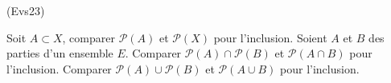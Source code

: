 \begin{tiny}(Evs23)\end{tiny} Soit $A\subset X$, comparer $\mathcal{P}(A)$ et $\mathcal{P}(X)$ pour l'inclusion. Soient $A$ et $B$ des parties d'un ensemble $E$. Comparer $\mathcal{P}(A) \cap \mathcal{P}(B)$ et $\mathcal{P}(A\cap B)$ pour l'inclusion.  Comparer $\mathcal{P}(A) \cup \mathcal{P}(B)$ et $\mathcal{P}(A\cup B)$ pour l'inclusion. 
